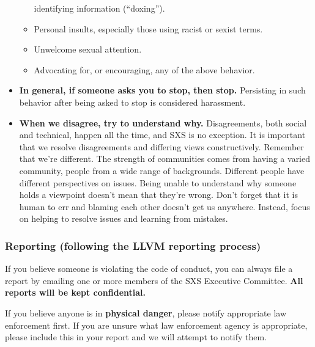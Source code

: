 \begin{itemize}
\begin{itemize}
    identifying information (“doxing”).
  \item Personal insults, especially those using racist or sexist
    terms.
  \item Unwelcome sexual attention.
  \item Advocating for, or encouraging, any of the above behavior.
  \end{itemize}
\item \textbf{In general, if someone asks you to stop, then stop.}
  Persisting in such behavior after being asked to stop is considered
  harassment.
\item \textbf{When we disagree, try to understand why.} Disagreements,
  both social and technical, happen all the time, and SXS is no
  exception. It is important that we resolve disagreements and
  differing views constructively.  Remember that we’re different. The
  strength of communities comes from having a varied community, people
  from a wide range of backgrounds. Different people have different
  perspectives on issues. Being unable to understand why someone holds
  a viewpoint doesn’t mean that they’re wrong. Don’t forget that it is
  human to err and blaming each other doesn’t get us
  anywhere. Instead, focus on helping to resolve issues and learning
  from mistakes.
\end{itemize}

\subsubsection{Reporting (following the LLVM reporting process)} 

If you believe someone is violating the code of conduct, you can
always file a report by emailing one or more members of the SXS
Executive Committee. \textbf{All reports will be kept confidential.}

If you believe anyone is in \textbf{physical danger}, please notify
appropriate law enforcement first. If you are unsure what law
enforcement agency is appropriate, please include this in your report
and we will attempt to notify them.

